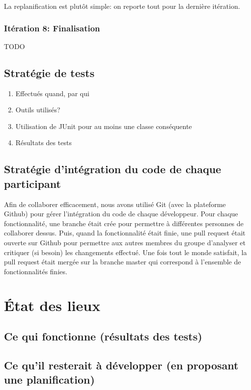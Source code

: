 \documentclass[a4paper,12pt]{article}
\begin{document}
	La replanification est plutôt simple: on reporte tout pour la dernière itération.
	
	\subsubsection{Itération 8: Finalisation}
	TODO
	
	
	\subsection{Stratégie de tests}
	\begin{enumerate}
		\item Effectués quand, par qui
		\item Outils utilisés?
		\item Utilisation de JUnit pour au moins une classe conséquente
		\item Résultats des tests
	\end{enumerate}

	\subsection{Stratégie d'intégration du code de chaque participant}
	Afin de collaborer efficacement, nous avons utilisé Git (avec la plateforme Github) pour gérer l'intégration du code de chaque développeur. Pour chaque fonctionnalité, une branche était crée pour permettre à différentes personnes de collaborer dessus. Puis, quand la fonctionnalité était finie, une pull request était ouverte sur Github pour permettre aux autres membres du groupe d'analyser et critiquer (si besoin) les changements effectué. Une fois tout le monde satisfait, la pull request était mergée sur la branche master qui correspond à l'ensemble de fonctionnalités finies.

	\section{État des lieux}
	
	
	\subsection{Ce qui fonctionne (résultats des tests)}
	
	
	\subsection{Ce qu'il resterait à développer (en proposant une planification)}
	
\end{document}
